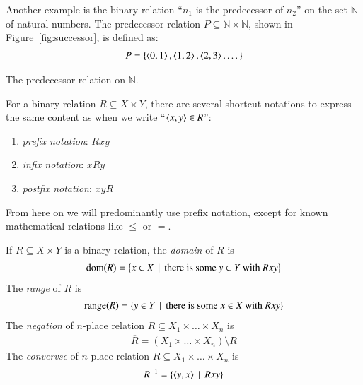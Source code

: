 \documentclass[nobib,nofonts]{tufte-handout}
\begin{document}
Another example is the binary relation ``$n_1$ is the predecessor of $n_2$'' on the set $\mathds{N}$ of natural numbers.
The predecessor relation $P \subseteq \mathds{N} \times \mathds{N}$, shown in Figure~\ref{fig:successor}, is defined as:
\begin{align*}
  P = \left\{\left \langle 0,1\right\rangle, \left \langle 1,2\right\rangle, \left \langle 2,3\right\rangle, \dots\right\}
\end{align*}
\begin{marginfigure}
\caption{The predecessor relation on $\mathds{N}$.}
\label{fig:successor}
\end{marginfigure}


For a binary relation $R\subseteq X \times Y$, there are several shortcut notations to express the same content as when we write ``$\left \langle x,y\right\rangle \in R$'':
\begin{enumerate}
\item[] \emph{prefix notation}: $Rxy$
\item[] \emph{infix notation}: $xRy$
\item[] \emph{postfix notation}: $xyR$
\end{enumerate}
From here on we will predominantly use prefix notation, except for known mathematical relations like $\le$ or $=$.

If $R \subseteq X \times Y$ is a binary relation, the \emph{domain} of $R$ is
\begin{align*}
  \text{dom}(R) = \left\{x \in X \thinspace \mid \thinspace \text{there is some $y \in Y$ with } Rxy\right\}
\end{align*}
The \emph{range} of $R$ is
\begin{align*}
  \text{range}(R) = \left\{y \in Y \thinspace \mid \thinspace \text{there is some $x \in X$ with } Rxy\right\}
\end{align*}
The \emph{negation} of $n$-place relation $R \subseteq X_1 \times \dots \times X_n$ is
\begin{align*}
  \overline{R} = (X_1 \times \dots \times X_n) \setminus R
\end{align*}
The \emph{convervse} of $n$-place relation $R \subseteq X_1 \times \dots \times X_n$ is
\begin{align*}
  R^{-1} = \left\{\left \langle y,x\right\rangle \thinspace \mid \thinspace Rxy\right\}
\end{align*}
\end{document}
